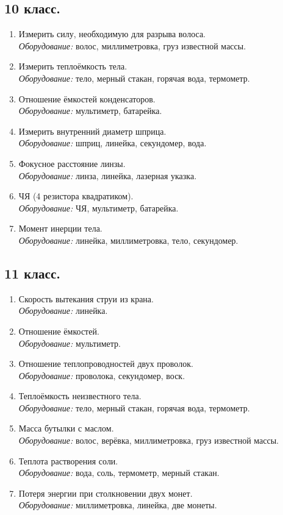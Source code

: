\documentclass[11pt]{article}
\newlength{\h}
\newlength{\x}
\begin{document}
\subsection{10 класс.}
\label{sec:day_exp10}
\begin{enumerate}
\item Измерить силу, необходимую для разрыва волоса.\\
  \emph{Оборудование:} волос, миллиметровка, груз известной массы.
\item Измерить теплоёмкость тела. \\
  \emph{Оборудование:} тело, мерный стакан, горячая вода, термометр.
\item Отношение ёмкостей конденсаторов.\\
  \emph{Оборудование:} мультиметр, батарейка.
\item Измерить внутренний диаметр шприца.\\ 
  \emph{Оборудование:} шприц, линейка, секундомер, вода.
\item Фокусное расстояние линзы. \\
  \emph{Оборудование:} линза, линейка, лазерная указка.
\item ЧЯ (4 резистора квадратиком).\\ 
  \emph{Оборудование:} ЧЯ, мультиметр, батарейка.
\item Момент инерции тела. \\
  \emph{Оборудование:} линейка, миллиметровка, тело, секундомер.
\end{enumerate}

\subsection{11 класс.}
\label{sec:day_exp11}
\begin{enumerate}
\item Скорость вытекания струи из крана. \\
   \emph{Оборудование:} линейка.
\item Отношение ёмкостей. \\
   \emph{Оборудование:} мультиметр.
\item Отношение теплопроводностей двух проволок. \\
   \emph{Оборудование:} проволока, секундомер, воск.
\item Теплоёмкость неизвестного тела. \\
   \emph{Оборудование:} тело, мерный стакан, горячая вода, термометр.
\item Масса бутылки с маслом. \\
   \emph{Оборудование:} волос, верёвка, миллиметровка, груз известной массы.
\item Теплота растворения соли. \\
   \emph{Оборудование:} вода, соль, термометр, мерный стакан.
\item Потеря энергии при столкновении двух монет. \\
   \emph{Оборудование:} миллиметровка, линейка, две монеты.
\end{enumerate}
\end{document}
